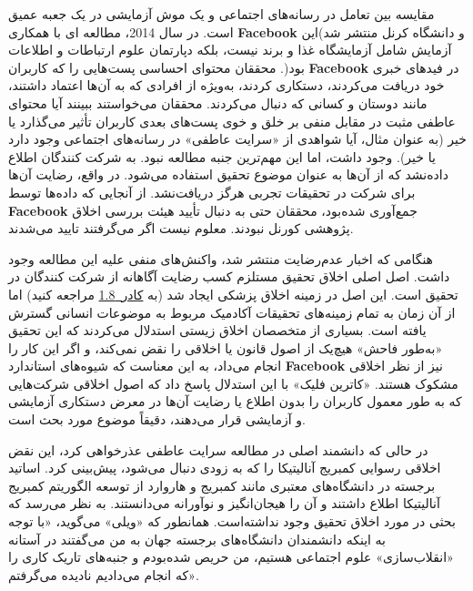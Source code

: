 مقایسه بین تعامل در رسانه‌های اجتماعی و یک موش آزمایشی در یک جعبه عمیق است.
در سال 2014، مطالعه ای با همکاری \textenglish{\textbf{Facebook}} و دانشگاه کرنل منتشر شد)این آزمایش شامل آزمایشگاه غذا و برند نیست، بلکه دپارتمان علوم ارتباطات و اطلاعات بود(.
محققان محتوای احساسی پست‌هایی را که کاربران \textenglish{\textbf{Facebook}} در فیدهای خبری خود دریافت می‌کردند، دستکاری کردند، به‌ویژه از افرادی که به آن‌ها اعتماد داشتند، مانند دوستان و کسانی که دنبال می‌کردند.
محققان می‌خواستند ببینند آیا محتوای عاطفی مثبت در مقابل منفی بر خلق و خوی پست‌های بعدی کاربران تأثیر می‌گذارد یا خیر (به عنوان مثال، آیا شواهدی از «سرایت عاطفی» در رسانه‌های اجتماعی وجود دارد یا خیر).
وجود داشت، اما این مهم‌ترین جنبه مطالعه نبود.
به شرکت کنندگان اطلاع داده‌نشد که از آن‌ها به عنوان موضوع تحقیق استفاده می‌شود.
در واقع، رضایت آن‌ها برای شرکت در تحقیقات تجربی هرگز دریافت‌نشد.
از آنجایی که داده‌ها توسط \textenglish{\textbf{Facebook}} جمع‌آوری شده‌بود، محققان حتی به دنبال تأیید هیئت بررسی اخلاق پژوهشی کورنل نبودند.
معلوم نیست اگر می‌گرفتند تایید می‌شدند.

هنگامی که اخبار عدم‌رضایت منتشر شد، واکنش‌های منفی علیه این مطالعه وجود داشت.
اصل اصلی اخلاق تحقیق مستلزم کسب رضایت آگاهانه از شرکت کنندگان در تحقیق است.
این اصل در زمینه اخلاق پزشکی ایجاد شد (به \hyperref[sec:کادر 1.8]{\mbox{کادر 1.8}} مراجعه کنید) اما از آن زمان به تمام زمینه‌های تحقیقات آکادمیک مربوط به موضوعات انسانی گسترش یافته است.
بسیاری از متخصصان اخلاق زیستی استدلال می‌کردند که این تحقیق «به‌طور فاحش» هیچ‌یک از اصول قانون یا اخلاقی را نقض نمی‌کند، و اگر این کار را انجام می‌داد، به این معناست که شیوه‌های استاندارد \textenglish{\textbf{Facebook}} نیز از نظر اخلاقی مشکوک هستند.
«کاترین فلیک» با این استدلال پاسخ داد که اصول اخلاقی شرکت‌هایی که به طور معمول کاربران را بدون اطلاع یا رضایت آن‌ها در معرض دستکاری آزمایشی و آزمایشی قرار می‌دهند، دقیقاً موضوع مورد بحث است.

در حالی که دانشمند اصلی در مطالعه سرایت عاطفی عذرخواهی کرد، این نقض اخلاقی رسوایی کمبریج آنالیتیکا را که به زودی دنبال می‌شود، پیش‌بینی کرد.
اساتید برجسته در دانشگاه‌های معتبری مانند کمبریج و هاروارد از توسعه الگوریتم کمبریج آنالیتیکا اطلاع داشتند و آن را هیجان‌انگیز و نوآورانه می‌دانستند.
به نظر می‌رسد که بحثی در مورد اخلاق تحقیق وجود نداشته‌است.
همانطور که «ویلی» می‌گوید، «با توجه به اینکه دانشمندان دانشگاه‌های برجسته جهان به من می‌گفتند در آستانه «انقلاب‌سازی» علوم اجتماعی هستیم، من حریص شده‌بودم و جنبه‌های تاریک کاری را که انجام می‌دادیم نادیده می‌گرفتم».


